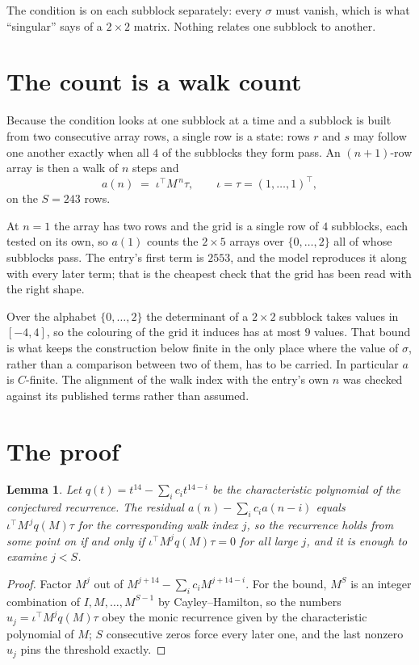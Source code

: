 \documentclass[11pt,a4paper]{article}
\theoremstyle{plain}
\newtheorem{lemma}[theorem]{Lemma}
\theoremstyle{definition}
\begin{document}
The condition is on each subblock separately: every $\sigma$ must vanish, which is what
``singular'' says of a $2\times2$ matrix. Nothing
relates one subblock to another.

\section{The count is a walk count}

Because the condition looks at one subblock at a time and a subblock is
built from two consecutive array rows, a single row is a state: rows $r$ and $s$ may follow one
another exactly when all $4$ of the subblocks they form pass. An $(n+1)$-row array is then a
walk of $n$ steps and
\[
a(n)\;=\;\iota^{\!\top}M^{\,n}\tau,\qquad\iota=\tau=(1,\dots,1)^{\!\top},
\]
on the $S=243$ rows.

At $n=1$ the array has two rows and the grid is a single row of $4$
subblocks, each tested on its own, so $a(1)$ counts the
$2\times5$ arrays over $\{0,\dots,2\}$ all of whose subblocks pass. The entry's
first term is $2553$, and the model reproduces it along with every later term; that is the
cheapest check that the grid has been read with the right shape.

Over the alphabet $\{0,\dots,2\}$ the determinant of a $2\times2$ subblock takes values in
$[-4,4]$, so the colouring of the grid it induces has at most $9$ values.
That bound is what keeps the construction below finite in the only place where the value of
$\sigma$, rather than a comparison between two of them, has to be carried.
In particular $a$ is $C$-finite. The alignment of the walk index with the entry's own $n$ was
checked against its published terms rather than assumed.

\section{The proof}

\begin{lemma}\label{lem:crit}
Let $q(t)=t^{14}-\sum_i c_it^{14-i}$ be the characteristic polynomial of the
conjectured recurrence. The residual $a(n)-\sum_ic_ia(n-i)$ equals
$\iota^{\!\top}M^{\,j}q(M)\tau$ for the corresponding walk index $j$, so the recurrence
holds from some point on if and only if $\iota^{\!\top}M^{j}q(M)\tau=0$ for all large $j$,
and it is enough to examine $j<S$.
\end{lemma}

\begin{proof}
Factor $M^{j}$ out of $M^{j+14}-\sum_ic_iM^{j+14-i}$. For the bound, $M^{S}$
is an integer combination of $I,M,\dots,M^{S-1}$ by Cayley--Hamilton, so the numbers
$u_j=\iota^{\!\top}M^{j}q(M)\tau$ obey the monic recurrence given by the characteristic
polynomial of $M$; $S$ consecutive zeros force every later one, and the last nonzero $u_j$
pins the threshold exactly.
\end{proof}
\end{document}
